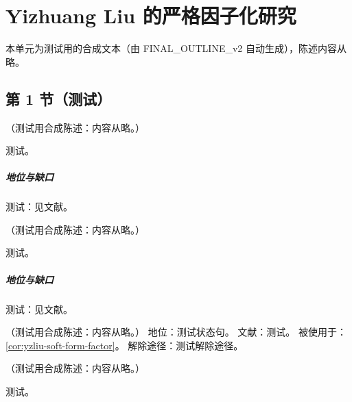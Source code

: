 \chapter{Yizhuang Liu 的严格因子化研究}\label{ch:yzliu}
本单元为测试用的合成文本（由 FINAL\_OUTLINE\_v2 自动生成），陈述内容从略。

\section{第 1 节（测试）}\label{sec:yzliu-intro}

\begin{lemma}\label{lem:yzliu-partial-exp}
（测试用合成陈述：内容从略。）
\end{lemma}
\begin{proofsketch}测试。\end{proofsketch}
\paragraph{地位与缺口}测试：见文献。

\begin{proposition}\label{prop:yzliu-pinch-ultrasoft}
（测试用合成陈述：内容从略。）
\end{proposition}
\begin{proofsketch}测试。\end{proofsketch}
\paragraph{地位与缺口}测试：见文献。

\begin{assumption}\label{asm:yzliu-heavy-pair}
（测试用合成陈述：内容从略。）
地位：测试状态句。
文献：测试。
被使用于：\cref{cor:yzliu-soft-form-factor}。
解除途径：测试解除途径。
\end{assumption}

\begin{theorem}\label{thm:yzliu-soft-hqet}
（测试用合成陈述：内容从略。）
\end{theorem}
\begin{proofsketch}测试。\end{proofsketch}
